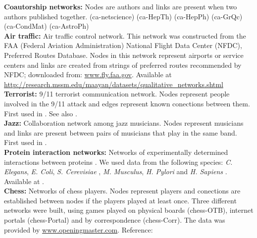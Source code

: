 \documentclass{article}
\begin{document}
\textbf{Coautorship networks:} Nodes are authors and links are present when two authors published together. (ca-netscience) (ca-HepTh) (ca-HepPh) (ca-GrQc) (ca-CondMat) (ca-AstroPh)
\\

\textbf{Air traffic:} Air traffic control network. This network was constructed from the FAA (Federal Aviation Administration) National Flight Data Center (NFDC), Preferred Routes Database. Nodes in this network represent airports or service centers and links are created from strings of preferred routes recommended by NFDC; downloaded from: \url{www.fly.faa.gov}. Available at \url{http://research.mssm.edu/maayan/datasets/qualitative_networks.shtml}
\\

\textbf{Terrorist:} 9/11 terrorist communication network. Nodes represent people involved in the 9/11 attack and edges represent known conections between them. First used in \cite{Krebs2002MappingCells}. See also \cite{Tian2017ArticulationNetworks}.
\\

\textbf{Jazz:} Collaboration network among jazz musicians. Nodes represent musicians and links are present between pairs of musicians that play in the same band. First used in \cite{Gleiser2003CommunityJazz}.
\\


\textbf{Protein interaction networks:} Networks of experimentally determined interactions between proteins \cite{Xenarios2000DIP:Proteins, Xenarios2002DIPInteractions}. We used data from the following species: \emph{C. Elegans}, \emph{E. Coli}, \emph{S. Cerevisiae} \cite{Colizza2006DetectingNetworks}, \emph{M. Musculus}, \emph{H. Pylori} and \emph{H. Sapiens} \cite{Goh2006SkeletonNetworks}. Available at \cite{DIP}.
\\

\textbf{Chess:} Networks of chess players. Nodes represent players and conections are established between nodes if the players played at least once. Three different networks were built, using games played on physical boards (chess-OTB), internet portals (chess-Portal) and by correspondence (chess-Corr). The data was provided by \url{www.openingmaster.com}. Reference: \cite{Almeira2017StructurePlayers}



\end{document}
